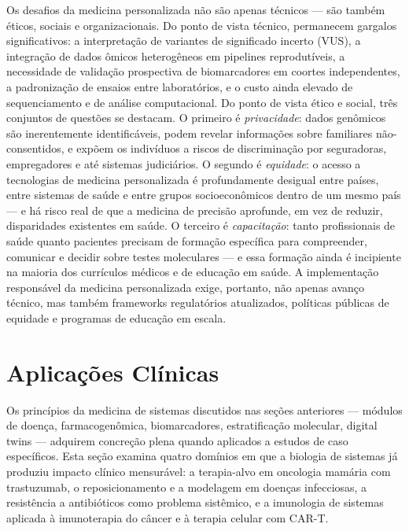 Os desafios da medicina personalizada não são apenas técnicos --- são também éticos, sociais e organizacionais. Do ponto de vista técnico, permanecem gargalos significativos: a interpretação de variantes de significado incerto (VUS), a integração de dados ômicos heterogêneos em pipelines reprodutíveis, a necessidade de validação prospectiva de biomarcadores em coortes independentes, a padronização de ensaios entre laboratórios, e o custo ainda elevado de sequenciamento e de análise computacional. Do ponto de vista ético e social, três conjuntos de questões se destacam. O primeiro é \emph{privacidade}: dados genômicos são inerentemente identificáveis, podem revelar informações sobre familiares não-consentidos, e expõem os indivíduos a riscos de discriminação por seguradoras, empregadores e até sistemas judiciários. O segundo é \emph{equidade}: o acesso a tecnologias de medicina personalizada é profundamente desigual entre países, entre sistemas de saúde e entre grupos socioeconômicos dentro de um mesmo país --- e há risco real de que a medicina de precisão aprofunde, em vez de reduzir, disparidades existentes em saúde. O terceiro é \emph{capacitação}: tanto profissionais de saúde quanto pacientes precisam de formação específica para compreender, comunicar e decidir sobre testes moleculares --- e essa formação ainda é incipiente na maioria dos currículos médicos e de educação em saúde. A implementação responsável da medicina personalizada exige, portanto, não apenas avanço técnico, mas também frameworks regulatórios atualizados, políticas públicas de equidade e programas de educação em escala.


\section{Aplicações Clínicas}
\label{sec:13-aplicacoes}

Os princípios da medicina de sistemas discutidos nas seções anteriores --- módulos de doença, farmacogenômica, biomarcadores, estratificação molecular, digital twins --- adquirem concreção plena quando aplicados a estudos de caso específicos. Esta seção examina quatro domínios em que a biologia de sistemas já produziu impacto clínico mensurável: a terapia-alvo em oncologia mamária com trastuzumab, o reposicionamento e a modelagem em doenças infecciosas, a resistência a antibióticos como problema sistêmico, e a imunologia de sistemas aplicada à imunoterapia do câncer e à terapia celular com CAR-T.

